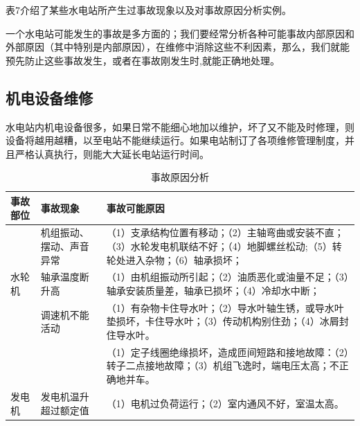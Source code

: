 \documentclass{ctexbook}
\begin{document}
表7介绍了某些水电站所产生过事故现象以及对事故原因分析实例。

一个水电站可能发生的事故是多方面的；我们要经常分析各种可能事故内部原因和外部原因（其中特别是内部原因），在维修中消除这些不利因素，那么，我们就能预先防止这些事故发生，或者在事故刚发生时,就能正确地处理。

\subsection{机电设备维修}

水电站内机电设备很多，如果日常不能细心地加以维护，坏了又不能及时修理，则设备将越用越糟，以至电站不能继续运行。如果电站制订了各项维修管理制度，并且严格认真执行，则能大大延长电站运行时间。

\begin{table}[htbp]
	\centering
	\caption{事故原因分析}
	\begin{tabular}{l|l|p{80em}}
		\hline
		事故部位&事故现象& \multicolumn{1}{l}{事故可能原因}\\ \hline
		&机组振动、摆动、声音异常 &（1）支承结构位置有移动；\newline{}（2）主轴弯曲或安装不直；\newline{}（3）水轮发电机联结不好；\newline{}（4）地脚螺丝松动;\newline{}（5）转轮处进入杂物；\newline{}（6）轴承损坏；\\ \hline
		水轮机&轴承温度断升高&（1）由机组振动所引起；\newline{}（2）油质恶化或油量不足；\newline{}（3）轴承安装质量差，轴承已损坏；\newline{}（4）冷却水中断；\\ \hline
		&调速机不能活动&（1）有杂物卡住导水叶；\newline{}（2）导水叶轴生锈，或导水叶垫损坏，卡住导水叶；\newline{}（3）传动机构别住劲；\newline{}（4）冰屑封住导水叶。\\ \hline
		& &（1）定子线圈绝缘损坏，造成匝间短路和接地故障：\newline{}（2）转子二点接地故障；\newline{}（3）机组飞逸时，端电压太高；不正确地并车。\\ \hline
		发电机&发电机温升超过额定值&（1）电机过负荷运行；\newline{}（2）室内通风不好，室温太高。\\ \hline

\end{tabular}
\end{table}
\end{document}
